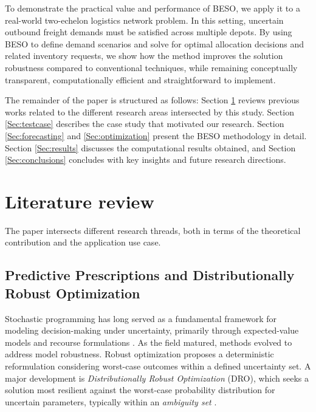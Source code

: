 \documentclass[review,a4paper,fleqn,3p,11pt,authoryear]{elsarticle}
\begin{document}
To demonstrate the practical value and performance of BESO, we apply it to a real-world two-echelon logistics network problem. In this setting, uncertain outbound freight demands must be satisfied across multiple depots. By using BESO to define demand scenarios and solve for optimal allocation decisions and related inventory requests, we show how the method improves the solution robustness compared to conventional techniques, while remaining conceptually transparent, computationally efficient and straightforward to implement.

The remainder of the paper is structured as follows: Section \ref{Sec:literature} reviews previous works related to the different research areas intersected by this study. Section \ref{Sec:testcase} describes the case study that motivated our research. Section \ref{Sec:forecasting} and \ref{Sec:optimization} present the BESO methodology in detail.  Section \ref{Sec:results} discusses the computational results obtained, and Section \ref{Sec:conclusions} concludes with key insights and future research directions.

\section{Literature review} \label{Sec:literature}

The paper intersects different research threads, both in terms of the theoretical contribution and the application use case.

\subsection{Predictive Prescriptions and Distributionally Robust Optimization}

Stochastic programming has long served as a fundamental framework for modeling decision-making under uncertainty, primarily through expected-value models and recourse formulations \citep{D55,B55}. As the field matured, methods evolved to address model robustness. Robust optimization \citep{BN98,BS04} proposes a deterministic reformulation considering worst-case outcomes within a defined uncertainty set. A major development is {\it Distributionally Robust Optimization} (DRO), which seeks a solution most resilient against the worst-case probability distribution for uncertain parameters, typically within an {\it ambiguity set} \citep{DY10}.
\end{document}
